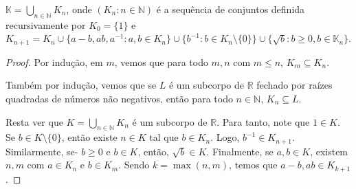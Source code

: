 \begin{lemma}
    $\mathbb K=\bigcup_{n \in \mathbb N} K_n$, onde $(K_n: n \in \mathbb N)$ é a sequência de conjuntos definida recursivamente por $K_0=\{1\}$ e $K_{n+1}=K_n\cup\{a-b, ab, a^{-1}: a, b \in K_n\}\cup\{b^{-1}: b\in K_n\setminus\{0\}\}\cup \{\sqrt b: b\geq 0, b \in \mathbb K_n\}$.
\end{lemma}

\begin{proof}
    Por indução, em $m$, vemos que para todo $m, n$ com $m\leq n$, $K_m\subseteq K_n$.

    Também por indução, vemos que se $L$ é um subcorpo de $\mathbb R$ fechado por raízes quadradas de números não negativos, então para todo $n\in \mathbb N$, $K_n\subseteq L$.

    Resta ver que $K=\bigcup_{n \in \mathbb N}K_n$ é um subcorpo de $\mathbb R$. Para tanto, note que $1 \in K$. Se $b\in K\setminus \{0\}$, então existe $n \in K$ tal que $b\in K_n$. Logo, $b^{-1} \in K_{n+1}$. Similarmente, se- $b\geq 0$ e $b \in K$, então, $\sqrt b \in K$. Finalmente, se $a, b \in K$, existem $n, m$ com $a\in K_n$ e $b\in K_m$. Sendo $k=\max(n, m)$, temos que $a-b, ab \in K_{k+1}$.     
\end{proof}

